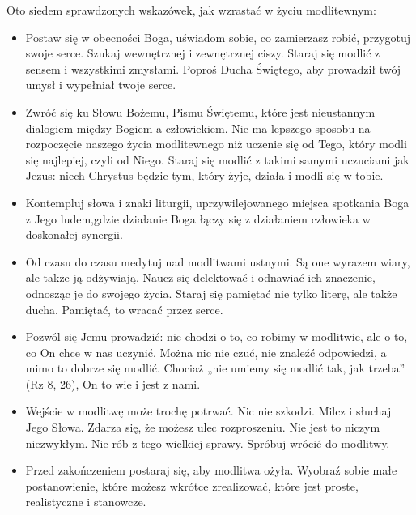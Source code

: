 ﻿\documentclass[9pt,twoside]{extarticle}
\begin{document}
{\hnr Oto siedem sprawdzonych wskazówek, jak wzrastać w życiu modlitewnym:


\begin{itemize}


\item Postaw się w obecności Boga, uświadom sobie, co zamierzasz robić, przygotuj swoje serce. Szukaj wewnętrznej i zewnętrznej ciszy. Staraj się modlić z sensem i wszystkimi zmysłami. Poproś Ducha Świętego, aby prowadził twój umysł i wypełniał twoje serce.


\item Zwróć się ku Słowu Bożemu, Pismu Świętemu, które jest nieustannym dialogiem między Bogiem a człowiekiem. Nie ma lepszego sposobu na rozpoczęcie naszego życia modlitewnego niż uczenie się od Tego, który modli się najlepiej, czyli od Niego. Staraj się modlić z takimi samymi uczuciami jak Jezus: niech Chrystus będzie tym, który żyje, działa i modli się w tobie.


\item Kontempluj słowa i znaki liturgii, uprzywilejowanego miejsca spotkania Boga z Jego ludem,\linebreak gdzie działanie Boga łączy się z działaniem człowieka w doskonałej synergii.


\item Od czasu do czasu medytuj nad modlitwami ustnymi. Są one wyrazem wiary, ale także ją odżywiają. Naucz się delektować i odnawiać ich znaczenie, odnosząc je do swojego życia. Staraj się pamiętać nie tylko literę, ale także ducha. Pamiętać, to wracać przez serce.


\item Pozwól się Jemu prowadzić: nie chodzi o to, co robimy w modlitwie, ale o to, co On chce w nas uczynić. Można nic nie czuć, nie znaleźć odpowiedzi, a mimo to dobrze się modlić. Chociaż „nie umiemy się modlić tak, jak trzeba” (Rz 8, 26), On to wie i jest z nami.


\item Wejście w modlitwę może trochę potrwać. Nic nie szkodzi. Milcz i słuchaj Jego Słowa. Zdarza się, że możesz ulec rozproszeniu. Nie jest to niczym niezwykłym. Nie rób z tego wielkiej sprawy. Spróbuj wrócić do modlitwy.


\item Przed zakończeniem postaraj się, aby modlitwa ożyła. Wyobraź sobie małe postanowienie, które możesz wkrótce zrealizować, które jest proste, realistyczne i stanowcze.


\end{itemize}


}
\end{document}
